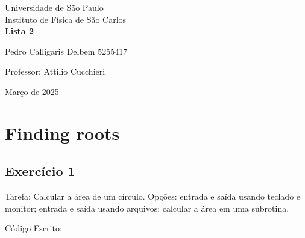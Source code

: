 \documentclass[12pt, a4paper]{article} %
\begin{document}
	
	\begin{titlepage}
		\begin{center}
\Huge{Universidade de São Paulo}\\
\large{Instituto de Física de São Carlos}\\
\vspace{20pt}
\vspace{200pt}
\textbf{Lista 2}\\
\vspace{8cm}
		\end{center}

\begin{flushleft}
\begin{tabbing}
Pedro Calligaris Delbem 5255417\\
\end{tabbing}
\vspace{0.5cm}
Professor: Attilio Cucchieri\\		
		\end{flushleft}
	
		\begin{center}
			\vspace{\fill}
	Março de 2025	
		\end{center}
	\end{titlepage}

	\tableofcontents 
	\thispagestyle{empty}
	\newpage

\section{Finding roots}

    \subsection{Exerc\'icio 1}

        Tarefa: Calcular a \'area de um c\'irculo. Op\c{c}\~oes: entrada e sa\'ida usando teclado e monitor; entrada e sa\'ida usando arquivos; calcular a  \'area em uma subrotina.

        C\'odigo Escrito:
        
\end{document}
